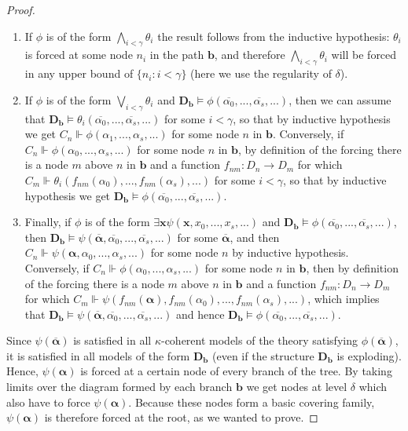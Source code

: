\documentclass[a4paper,11pt]{article}
\theoremstyle{plain}
\theoremstyle{plain}
\theoremstyle{remark}
\begin{document}
\begin{proof}
\begin{enumerate}
  \item If $\phi$ is of the form $\bigwedge_{i<\gamma} \theta_i$ the result follows from the inductive hypothesis: $\theta_i$ is forced at some node $n_i$ in the path $\mathbf{b}$, and therefore $\bigwedge_{i<\gamma} \theta_i$ will be forced in any upper bound of $\{n_i: i<\gamma\}$ (here we use the regularity of $\delta$).
  
  \item If $\phi$ is of the form $\bigvee_{i<\gamma} \theta_i$ and $\mathbf{D_b} \vDash \phi(\overline{\alpha_0}, ..., \overline{\alpha_s}, ...)$, then we can assume that $\mathbf{D_b} \vDash \theta_i(\overline{\alpha_0}, ..., \overline{\alpha_s}, ...)$ for some $i<\gamma$, so that by inductive hypothesis we get $C_n \Vdash \phi(\alpha_1, ..., \alpha_s, ...)$ for some node $n$ in $\mathbf{b}$. Conversely, if $C_n \Vdash \phi(\alpha_0, ..., \alpha_s, ...)$ for some node $n$ in $\mathbf{b}$, by definition of the forcing there is a node $m$ above $n$ in $\mathbf{b}$ and a function $f_{nm}: D_n \to D_m$ for which $C_m \Vdash \theta_i(f_{nm}(\alpha_0), ..., f_{nm}(\alpha_s), ...)$ for some $i<\gamma$, so that by inductive hypothesis we get $\mathbf{D_b} \vDash \phi(\overline{\alpha_0}, ..., \overline{\alpha_s}, ...)$.
  
  \item Finally, if $\phi$ is of the form $\exists \mathbf{x} \psi(\mathbf{x}, x_0, ..., x_s, ...)$ and $\mathbf{D_b} \vDash \phi(\overline{\alpha_0}, ..., \overline{\alpha_s}, ...)$, then $\mathbf{D_b} \vDash \psi(\boldsymbol{\overline{\alpha}}, \overline{\alpha_0}, ..., \overline{\alpha_s}, ...)$ for some $\boldsymbol{\overline{\alpha}}$, and then $C_n \Vdash \psi(\boldsymbol{\alpha}, \alpha_0, ..., \alpha_s, ...)$ for some node $n$ by inductive hypothesis. Conversely, if $C_n \Vdash \phi(\alpha_0, ..., \alpha_s, ...)$ for some node $n$ in $\mathbf{b}$, then by definition of the forcing there is a node $m$ above $n$ in $\mathbf{b}$ and a function $f_{nm}: D_n \to D_m$ for which $C_m \Vdash \psi(f_{nm}(\boldsymbol{\alpha}), f_{nm}(\alpha_0), ..., f_{nm}(\alpha_s), ...)$, which implies that $\mathbf{D_b} \vDash \psi(\boldsymbol{\overline{\alpha}}, \overline{\alpha_0}, ..., \overline{\alpha_s}, ...)$ and hence $\mathbf{D_b} \vDash \phi(\overline{\alpha_0}, ..., \overline{\alpha_s}, ...)$. 
 \end{enumerate}
   
 
 Since $\psi(\overline{\boldsymbol{\alpha}})$ is satisfied in all $\kappa$-coherent models of the theory satisfying $\phi(\overline{\boldsymbol{\alpha}})$, it is satisfied in all models of the form $\mathbf{D_b}$ (even if the structure $\mathbf{D_b}$ is exploding). Hence, $\psi(\boldsymbol{\alpha})$ is forced at a certain node of every branch of the tree. By taking limits over the diagram formed by each branch $\mathbf{b}$ we get nodes at level $\delta$ which also have to force $\psi(\boldsymbol{\alpha})$. Because these nodes form a basic covering family, $\psi(\boldsymbol{\alpha})$ is therefore forced at the root, as we wanted to prove. 
\end{proof}
\end{document}
